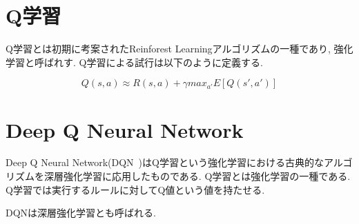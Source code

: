 \section{Q学習}

Q学習とは初期に考案されたReinforest Learningアルゴリズムの一種であり, 強化学習と呼ばれす.
Q学習による試行は以下のように定義する.

\begin{equation}
    Q(s, a) \approx R(s, a) + \gamma max_{a'} E[Q(s', a')]
\end{equation}

\section{Deep Q Neural Network}

Deep Q Neural Network(DQN~\cite{DQN})はQ学習という強化学習における古典的なアルゴリズムを深層強化学習に応用したものである.
Q学習とは強化学習の一種である. Q学習では実行するルールに対してQ値という値を持たせる.

DQNは深層強化学習とも呼ばれる.


